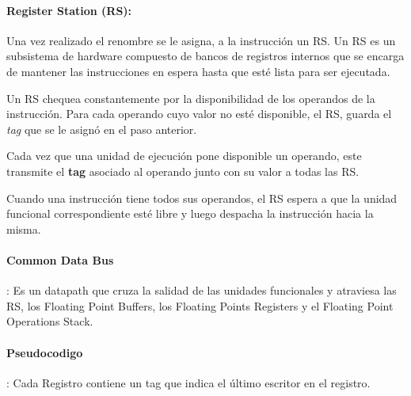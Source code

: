 \paragraph{Register Station (RS):} Una vez realizado el renombre se le asigna, a la instrucción un RS. Un RS es un subsistema de hardware compuesto de bancos de registros internos que se encarga de mantener las instrucciones en espera hasta que esté lista para ser ejecutada.

Un RS chequea constantemente por la disponibilidad de los operandos de la instrucción. Para cada operando cuyo valor no esté disponible, el RS, guarda el \textit{tag} que se le asignó en el paso anterior.

Cada vez que una unidad de ejecución pone disponible un operando, este transmite el \textbf{tag} asociado al operando junto con su valor a todas las RS.

Cuando una instrucción tiene todos sus operandos, el RS espera a que la unidad funcional correspondiente esté libre y luego despacha la instrucción hacia la misma.

\paragraph{Common Data Bus}: Es un datapath que cruza la salidad de las unidades funcionales y atraviesa las RS, los Floating Point Buffers, los Floating Points Registers y el Floating Point Operations Stack.

\newpage
\paragraph{Pseudocodigo}:
Cada Registro contiene un tag que indica el último escritor en el registro.

\begin{algorithmic}
	\Else
\EndIf
{}
\EndIf
{}
\EndIf
\EndIf
\EndIf
\EndWhile
\end{algorithmic}
	\nocite{*}






